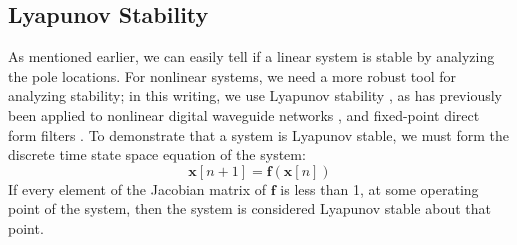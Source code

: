 \documentclass[twoside,a4paper]{article}
\begin{document}
\subsection{Lyapunov Stability}
%
As mentioned earlier, we can easily tell if a linear system is stable
by analyzing the pole locations. For nonlinear systems, we need a
more robust tool for analyzing stability; in this writing, we use
Lyapunov stability \cite{Lyapunov}, as has previously been applied
to nonlinear digital waveguide networks \cite{JOS-Waveguide}, and
fixed-point direct form filters \cite{LyapunovFixedPointFilters}. To
demonstrate that a system is Lyapunov stable, we must form the discrete
time state space equation of the system:
%
\begin{equation}
    \mathbf{x}[n+1] = \mathbf{f}(\mathbf{x}[n])
    \label{eq:lyapunov_general}
\end{equation}
%
If every element of the Jacobian matrix of $\mathbf{f}$ is less than 1,
at some operating point of the system, then the system is considered
Lyapunov stable about that point.
\end{document}
